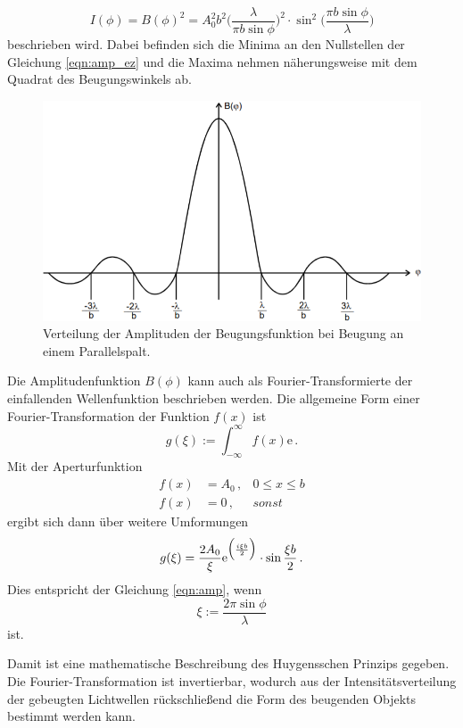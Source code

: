 \begin{equation}
    I(\phi) = B(\phi)^2 = A_0^2 b^2 \Biggl(\frac{\lambda}{\pi b \sin\phi}\Biggr)^2 \cdot \sin^2\Biggl(\frac{\pi b\sin\phi}{\lambda}\Biggr)
\end{equation}
beschrieben wird. Dabei befinden sich die Minima an den Nullstellen der Gleichung \ref{eqn:amp_ez} und die Maxima nehmen näherungsweise 
mit dem Quadrat des Beugungswinkels ab. 
\begin{figure}
    \centering
    \includegraphics[width=\textwidth]{data/amp_verteilung.png}
    \caption{Verteilung der Amplituden der Beugungsfunktion bei Beugung an einem Parallelspalt.}
    \label{fig:int_vert}
\end{figure}

Die Amplitudenfunktion $B(\phi)$ kann auch als Fourier-Transformierte der einfallenden Wellenfunktion beschrieben werden. 
Die allgemeine Form einer Fourier-Transformation der Funktion $f(x) $ ist 
\begin{equation}
    g(\xi) := \int_{-\infty}^\infty f(x)\mathrm{e}\,.
\end{equation}
Mit der Aperturfunktion 
\begin{align}
    f(x) &= A_0\,,& 0\leq x\leq b\\
    f(x) &= 0\,,& sonst 
\end{align}
ergibt sich dann über weitere Umformungen
\begin{equation}
    g(\xi) = \frac{2A_0}{\xi} \mathrm{e}^{\Bigl(\frac{i\xi b}{2}\Bigr)}\cdot\sin\frac{\xi b}{2}\,.
\end{equation}
Dies entspricht der Gleichung \ref{eqn:amp}, wenn 
\begin{equation}
    \xi := \frac{2\pi\sin\phi}{\lambda}
\end{equation}
ist.

Damit ist eine mathematische Beschreibung des Huygensschen Prinzips gegeben. Die Fourier-Transformation ist invertierbar, wodurch aus der 
Intensitätsverteilung der gebeugten Lichtwellen rückschließend die Form des beugenden Objekts bestimmt werden kann. 